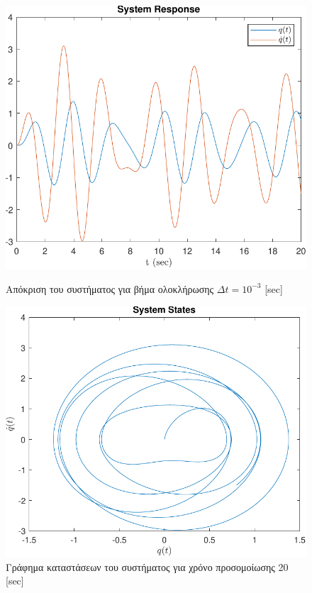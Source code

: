 \documentclass[a4paper,12pt]{article}
\begin{document}
\begin{figure}[!h]
    \centering
    \begin{minipage}{0.45\textwidth}
        \centering
        \includegraphics[width=\linewidth]{plot/task1_system_response.pdf}
        \caption{Απόκριση του συστήματος για βήμα ολοκλήρωσης $\Delta t = 10^{-3}$ 
        [sec]}
        \label{fig:task1_system_response}
    \end{minipage}
    \hfill
    \begin{minipage}{0.45\textwidth}
        \centering
        \includegraphics[width=\linewidth]{plot/task1_system_states.pdf}
        \caption{Γράφημα καταστάσεων του συστήματος για χρόνο προσομοίωσης 20 
        [sec]}
        \label{fig:task1_system_states}
    \end{minipage}
\end{figure}
\end{document}
